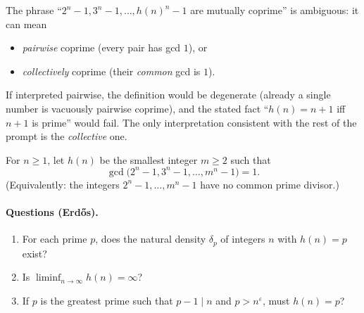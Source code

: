 The phrase ``$2^n-1,3^n-1,\dots,h(n)^n-1$ are mutually coprime'' is ambiguous: it can mean
\begin{itemize}[leftmargin=2em]
\item \emph{pairwise} coprime (every pair has gcd $1$), or
\item \emph{collectively} coprime (their \emph{common} gcd is $1$).
\end{itemize}
If interpreted pairwise, the definition would be degenerate (already a single number is vacuously pairwise coprime), and the stated fact ``$h(n)=n+1$ iff $n+1$ is prime'' would fail.
The only interpretation consistent with the rest of the prompt is the \emph{collective} one.

\begin{definition}[$h(n)$]
For $n\ge 1$, let $h(n)$ be the smallest integer $m\ge 2$ such that
\[
\gcd\bigl(2^n-1,3^n-1,\dots,m^n-1\bigr)=1.
\]
(Equivalently: the integers $2^n-1,\dots,m^n-1$ have no common prime divisor.)
\end{definition}

\paragraph{Questions (Erd\H{o}s).}
\begin{enumerate}[label=(\alph*),leftmargin=2.2em]
\item For each prime $p$, does the natural density $\delta_p$ of integers $n$ with $h(n)=p$ exist?
\item Is $\liminf_{n\to\infty} h(n)=\infty$?
\item If $p$ is the greatest prime such that $p-1\mid n$ and $p>n^{\varepsilon}$, must $h(n)=p$?
\end{enumerate}

